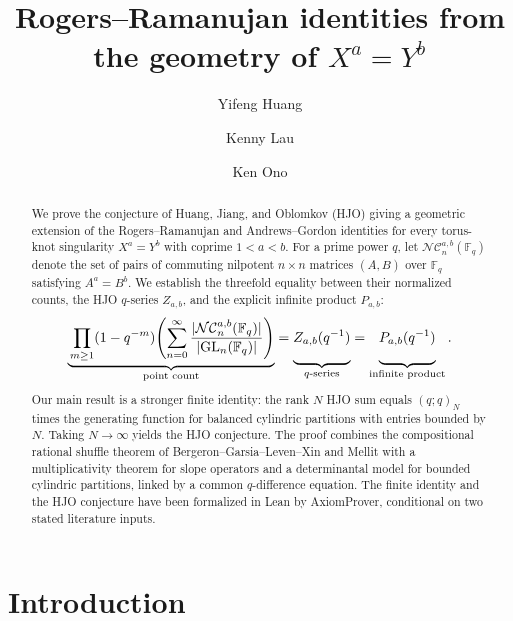\documentclass[12pt,reqno]{amsart}
\title{Rogers--Ramanujan identities from the geometry of $X^a=Y^b$}
\author{Yifeng Huang}
\author{Kenny Lau}
\author{Ken Ono}
\date{}
\numberwithin{equation}{section}
\theoremstyle{definition}
\theoremstyle{remark}
\theoremstyle{plain}
\begin{document}
\begin{abstract}
We prove the conjecture of Huang, Jiang, and Oblomkov (HJO)
giving a geometric extension of the Rogers--Ramanujan and
Andrews--Gordon identities for every torus-knot singularity
\(X^a=Y^b\) with coprime \(1<a<b\).
For a prime power \(q\), let
\(\mathcal{NC}_n^{a,b}(\mathbb F_q)\) denote the set of pairs
of commuting nilpotent \(n\times n\) matrices \((A,B)\) over
\(\mathbb F_q\) satisfying \(A^a=B^b\).
We establish the threefold equality between their normalized
counts, the HJO \(q\)-series \(Z_{a,b}\), and the explicit
infinite product \(P_{a,b}\):
\[
\underbrace{\vphantom{\Bigg|}
\prod_{m\geq1}(1-q^{-m})
\Biggl(\sum_{n=0}^{\infty}
\frac{\lvert\mathcal{NC}_n^{a,b}(\mathbb F_q)\rvert}
{\lvert\operatorname{GL}_n(\mathbb F_q)\rvert}\Biggr)
}_{\text{point count}}
=
\underbrace{\vphantom{\Bigg|}Z_{a,b}(q^{-1})
}_{\text{\(q\)-series}}
=
\underbrace{\vphantom{\Bigg|}P_{a,b}(q^{-1})
}_{\text{infinite product}}.
\]
Our main result is a stronger finite identity: the rank \(N\)
HJO sum equals \((q;q)_N\) times the generating function for
balanced cylindric partitions with entries bounded by \(N\).
Taking \(N\to\infty\) yields the HJO conjecture.
The proof combines the compositional rational shuffle theorem
of Bergeron--Garsia--Leven--Xin and Mellit with a multiplicativity
theorem for slope operators and a determinantal model for
bounded cylindric partitions, linked by a common
\(q\)-difference equation.
The finite identity and the HJO conjecture have been formalized
in Lean by AxiomProver, conditional on two stated literature inputs.
\end{abstract}


\maketitle

\section{Introduction}
\end{document}
